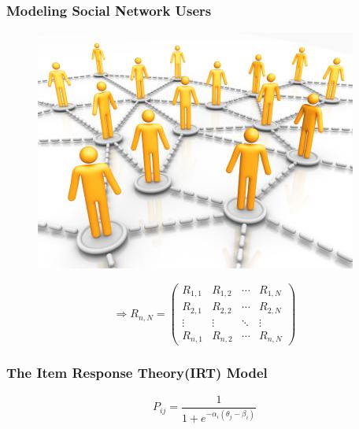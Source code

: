 \documentclass{beamer}
\begin{document}
\begin{frame}[fragile]
  \frametitle{Modeling Social Network Users}

  \begin{figure}
    \begin{center}
      \includegraphics[scale=1.5]{socialnetwork}
    \end{center}
  \end{figure}

\[
\Longrightarrow
 R_{n,N} =
 \begin{pmatrix}
  R_{1,1} & R_{1,2} & \cdots & R_{1,N} \\
  R_{2,1} & R_{2,2} & \cdots & R_{2,N} \\
  \vdots  & \vdots  & \ddots & \vdots  \\
  R_{n,1} & R_{n,2} & \cdots & R_{n,N}
 \end{pmatrix}
\]

\end{frame}

\begin{frame}[fragile]
  \frametitle{The Item Response Theory(IRT) Model}
\Huge{
  \[P_{ij}=\frac{1}{1+e^{-\alpha_i(\theta_j-\beta_i)}}\]
}
\end{frame}

\end{document}
